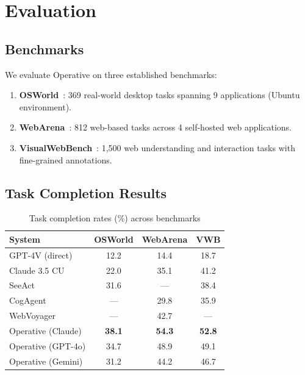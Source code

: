 \section{Evaluation}

\label{sec:evaluation}

\subsection{Benchmarks}

We evaluate Operative on three established benchmarks:

\begin{enumerate}[leftmargin=*]
    \item \textbf{OSWorld}~\cite{xie2024osworld}: 369 real-world desktop tasks spanning 9 applications (Ubuntu environment).
    \item \textbf{WebArena}~\cite{zhou2024webarena}: 812 web-based tasks across 4 self-hosted web applications.
    \item \textbf{VisualWebBench}~\cite{liu2024visualwebbench}: 1,500 web understanding and interaction tasks with fine-grained annotations.
\end{enumerate}

\subsection{Task Completion Results}

\begin{table}[t]
\centering
\caption{Task completion rates (\%) across benchmarks}
\label{tab:results}
\begin{tabular}{@{}lccc@{}}
\toprule
\textbf{System} & \textbf{OSWorld} & \textbf{WebArena} & \textbf{VWB} \\
\midrule
GPT-4V (direct) & 12.2 & 14.4 & 18.7 \\
Claude 3.5 CU & 22.0 & 35.1 & 41.2 \\
SeeAct & 31.6 & --- & 38.4 \\
CogAgent & --- & 29.8 & 35.9 \\
WebVoyager & --- & 42.7 & --- \\
\midrule
Operative (Claude) & \textbf{38.1} & \textbf{54.3} & \textbf{52.8} \\
Operative (GPT-4o) & 34.7 & 48.9 & 49.1 \\
Operative (Gemini) & 31.2 & 44.2 & 46.7 \\
\bottomrule
\end{tabular}
\end{table}

